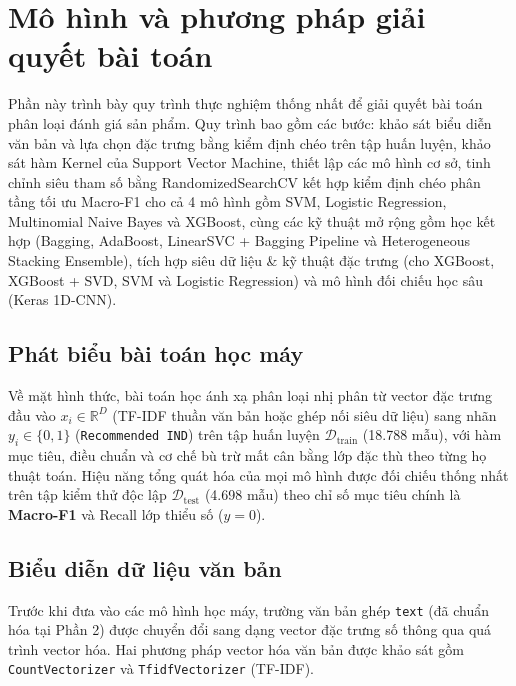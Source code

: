\section{Mô hình và phương pháp giải quyết bài toán}

Phần này trình bày quy trình thực nghiệm thống nhất để giải quyết bài toán phân loại đánh giá sản phẩm. Quy trình bao gồm các bước: khảo sát biểu diễn văn bản và lựa chọn đặc trưng bằng kiểm định chéo trên tập huấn luyện, khảo sát hàm Kernel của Support Vector Machine, thiết lập các mô hình cơ sở, tinh chỉnh siêu tham số bằng RandomizedSearchCV kết hợp kiểm định chéo phân tầng tối ưu Macro-F1 cho cả 4 mô hình gồm SVM, Logistic Regression, Multinomial Naive Bayes và XGBoost, cùng các kỹ thuật mở rộng gồm học kết hợp (Bagging, AdaBoost, LinearSVC + Bagging Pipeline và Heterogeneous Stacking Ensemble), tích hợp siêu dữ liệu \& kỹ thuật đặc trưng (cho XGBoost, XGBoost + SVD, SVM và Logistic Regression) và mô hình đối chiếu học sâu (Keras 1D-CNN).

\subsection{Phát biểu bài toán học máy}
Về mặt hình thức, bài toán học ánh xạ phân loại nhị phân từ vector đặc trưng đầu vào $x_i \in \mathbb{R}^D$ (TF-IDF thuần văn bản hoặc ghép nối siêu dữ liệu) sang nhãn $y_i \in \{0, 1\}$ (\texttt{Recommended IND}) trên tập huấn luyện $\mathcal{D}_{\text{train}}$ (18.788 mẫu), với hàm mục tiêu, điều chuẩn và cơ chế bù trừ mất cân bằng lớp đặc thù theo từng họ thuật toán. Hiệu năng tổng quát hóa của mọi mô hình được đối chiếu thống nhất trên tập kiểm thử độc lập $\mathcal{D}_{\text{test}}$ (4.698 mẫu) theo chỉ số mục tiêu chính là \textbf{Macro-F1} và Recall lớp thiểu số ($y = 0$).

\subsection{Biểu diễn dữ liệu văn bản}
Trước khi đưa vào các mô hình học máy, trường văn bản ghép \texttt{text} (đã chuẩn hóa tại Phần 2) được chuyển đổi sang dạng vector đặc trưng số thông qua quá trình vector hóa. Hai phương pháp vector hóa văn bản được khảo sát gồm \texttt{CountVectorizer} và \texttt{TfidfVectorizer} (TF-IDF).

